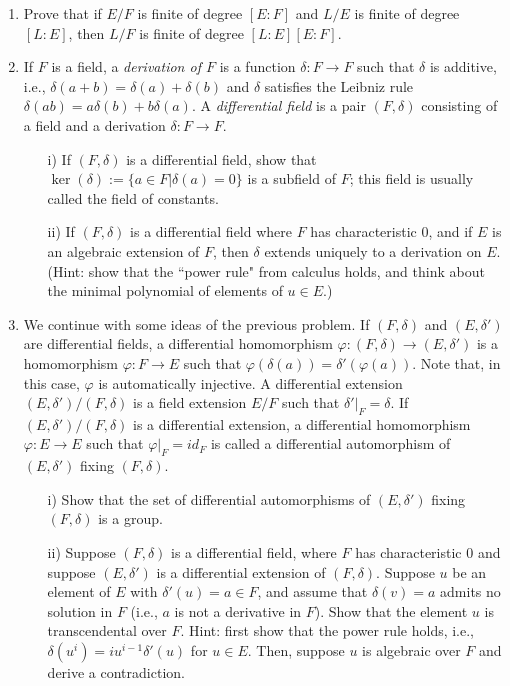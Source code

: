 \documentclass[11pt,leqno]{article}
\newcommand{\<}[1]{{\langle}#1 {\rangle}}
\theoremstyle{plain}
\theoremstyle{definition}
\theoremstyle{remark}
\numberwithin{equation}{section}
\begin{document}
\begin{enumerate}
\item Prove that if $E/F$ is finite of degree $[E:F]$ and $L/E$ is finite of degree $[L:E]$, then $L/F$ is finite of degree $[L:E][E:F]$.
\item If $F$ is a field, a {\em derivation of $F$} is a function $\delta: F \to F$ such that $\delta$ is additive, i.e., $\delta(a + b) = \delta(a) + \delta(b)$ and $\delta$ satisfies the Leibniz rule $\delta(ab) = a \delta(b) + b\delta(a)$.  A {\em differential field} is a pair $(F,\delta)$ consisting of a field and a derivation $\delta: F \to F$.
    \begin{itemize}
    \item[i)] If $(F,\delta)$ is a differential field, show that $\ker(\delta) := \{ a \in F | \delta(a) = 0 \}$ is a subfield of $F$; this field is usually called the field of constants.
    \item[ii)] If $(F,\delta)$ is a differential field where $F$ has characteristic $0$, and if $E$ is an algebraic extension of $F$, then $\delta$ extends uniquely to a derivation on $E$. (Hint: show that the ``power rule" from calculus holds, and think about the minimal polynomial of elements of $u \in E$.)
    \end{itemize}
\item We continue with some ideas of the previous problem.  If $(F,\delta)$ and $(E,\delta')$ are differential fields, a differential homomorphism $\varphi: (F,\delta) \to (E,\delta')$ is a homomorphism $\varphi: F \to E$ such that $\varphi(\delta(a)) = \delta'(\varphi(a))$.  Note that, in this case, $\varphi$ is automatically injective.  A differential extension $(E,\delta')/(F,\delta)$ is a field extension $E/F$ such that $\delta'|_F = \delta$.  If  $(E,\delta')/(F,\delta)$ is a differential extension, a differential homomorphism $\varphi: E \to E$ such that $\varphi|_F = id_F$ is called a differential automorphism of $(E,\delta')$ fixing $(F,\delta)$.
    \begin{itemize}
    \item[i)]Show that the set of differential automorphisms of $(E,\delta')$ fixing $(F,\delta)$ is a group.
    \item[ii)] Suppose $(F,\delta)$ is a differential field, where $F$ has characteristic $0$ and suppose $(E,\delta')$ is a differential extension of $(F,\delta)$.  Suppose $u$ be an element of $E$ with $\delta'(u) = a \in F$, and assume that $\delta(v) = a$ admits no solution in $F$ (i.e., $a$ is not a derivative in $F$).  Show that the element $u$ is transcendental over $F$.  Hint: first show that the power rule holds, i.e., $\delta(u^i) = iu^{i-1} \delta'(u)$ for $u \in E$.  Then, suppose $u$ is algebraic over $F$ and derive a contradiction.

\end{itemize}
\end{enumerate}
\end{document}
